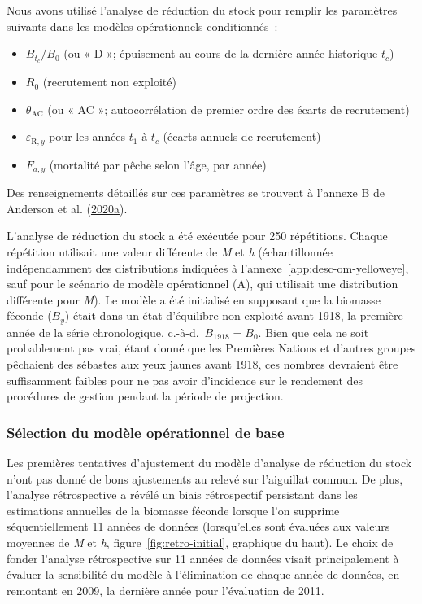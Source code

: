 \documentclass[11pt]{book}
\begin{document}
Nous avons utilisé l'analyse de réduction du stock pour remplir les paramètres suivants dans les modèles opérationnels conditionnés~:
\begin{itemize}

\item
  \(B_{t_c}/B_0\) (ou « D »; épuisement au cours de la dernière année historique \(t_c\))
\item
  \(R_0\) (recrutement non exploité)
\item
  \(\theta_\textrm{AC}\) (ou « AC »; autocorrélation de premier ordre des écarts de recrutement)
\item
  \(\varepsilon_{\textrm{R},y}\) pour les années \(t_1\) à \(t_c\) (écarts annuels de recrutement)
\item
  \(F_{a,y}\) (mortalité par pêche selon l'âge, par année)
\end{itemize}
Des renseignements détaillés sur ces paramètres se trouvent à l'annexe B de Anderson et al. (\protect\hyperlink{ref-anderson2020gfmp}{2020}\protect\hyperlink{ref-anderson2020gfmp}{a}).

L'analyse de réduction du stock a été exécutée pour 250 répétitions. Chaque répétition utilisait une valeur différente de \emph{M} et \emph{h} (échantillonnée indépendamment des distributions indiquées à l'annexe~\ref{app:desc-om-yelloweye}, sauf pour le scénario de modèle opérationnel (A), qui utilisait une distribution différente pour \emph{M}). Le modèle a été initialisé en supposant que la biomasse féconde (\(B_y\)) était dans un état d'équilibre non exploité avant 1918, la première année de la série chronologique, c.-à-d.~\(B_{1918} = B_0\). Bien que cela ne soit probablement pas vrai, étant donné que les Premières Nations et d'autres groupes pêchaient des sébastes aux yeux jaunes avant 1918, ces nombres devraient être suffisamment faibles pour ne pas avoir d'incidence sur le rendement des procédures de gestion pendant la période de projection.

\hypertarget{sec:approach3-conditioning-base-om}{%
\subsubsection{Sélection du modèle opérationnel de base}\label{sec:approach3-conditioning-base-om}}

Les premières tentatives d'ajustement du modèle d'analyse de réduction du stock n'ont pas donné de bons ajustements au relevé sur l'aiguillat commun. De plus, l'analyse rétrospective a révélé un biais rétrospectif persistant dans les estimations annuelles de la biomasse féconde lorsque l'on supprime séquentiellement 11 années de données (lorsqu'elles sont évaluées aux valeurs moyennes de \emph{M} et \emph{h}, figure~\ref{fig:retro-initial}, graphique du haut). Le choix de fonder l'analyse rétrospective sur 11 années de données visait principalement à évaluer la sensibilité du modèle à l'élimination de chaque année de données, en remontant en 2009, la dernière année pour l'évaluation de 2011.
\end{document}
